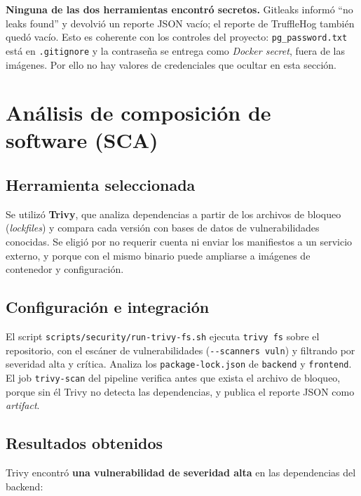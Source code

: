 \textbf{Ninguna de las dos herramientas encontró secretos.} Gitleaks informó
``no leaks found'' y devolvió un reporte JSON vacío; el reporte de
TruffleHog también quedó vacío. Esto es coherente con los controles del
proyecto: \texttt{pg\_password.txt} está en \texttt{.gitignore} y la
contraseña se entrega como \textit{Docker secret}, fuera de las imágenes. Por
ello no hay valores de credenciales que ocultar en esta sección.


\section{Análisis de composición de software (SCA)}

\subsection{Herramienta seleccionada}

Se utilizó \textbf{Trivy}, que analiza dependencias a partir de los archivos
de bloqueo (\textit{lockfiles}) y compara cada versión con bases de datos de
vulnerabilidades conocidas. Se eligió por no requerir cuenta ni enviar los
manifiestos a un servicio externo, y porque con el mismo binario puede
ampliarse a imágenes de contenedor y configuración.

\subsection{Configuración e integración}

El script \texttt{scripts/security/run-trivy-fs.sh} ejecuta \texttt{trivy fs}
sobre el repositorio, con el escáner de vulnerabilidades
(\texttt{-{}-scanners vuln}) y filtrando por severidad alta y crítica. Analiza
los \texttt{package-lock.json} de \texttt{backend} y \texttt{frontend}. El job
\texttt{trivy-scan} del pipeline verifica antes que exista el archivo de
bloqueo, porque sin él Trivy no detecta las dependencias, y publica el
reporte JSON como \textit{artifact}.

\subsection{Resultados obtenidos}

Trivy encontró \textbf{una vulnerabilidad de severidad alta} en las
dependencias del backend:

